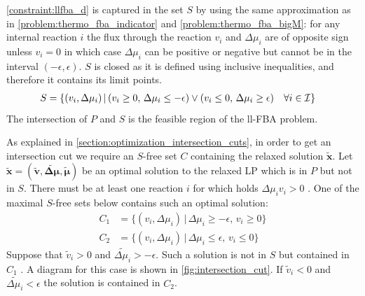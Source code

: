 \cref{constraint:llfba_d} is captured in the set $S$ by using the same approximation as in \cref{problem:thermo_fba_indicator} and \cref{problem:thermo_fba_bigM}:
for any internal reaction $i$ the flux through the reaction $v_i$ and $\Delta \mu_i$ are of opposite sign unless $v_i=0$ in which case $\Delta \mu_i$ can be positive or negative but cannot be in the interval $(- \epsilon, \epsilon)$. $S$ is closed as it is defined using inclusive inequalities, and therefore it contains its limit points. 
\begin{align*}
    \centering
    S &= \{(v_i, \Delta\mu_i) \, | \, (v_i \geq 0, \, \Delta \mu_i \leq - \epsilon) \lor (v_i \leq 0, \, \Delta \mu_i \geq \epsilon) \quad \forall i \in \mathcal{I}\}
\end{align*}
The intersection of $P$ and $S$ is the feasible region of the ll-FBA problem. 

As explained in \cref{section:optimization_intersection_cuts}, in order to get an intersection cut we require an $S$-free set $C$ containing the relaxed solution $\boldsymbol{\tilde x}$. Let $\boldsymbol{\tilde x} = (\boldsymbol{\tilde v}, \boldsymbol{\tilde{\Delta \mu}}, \boldsymbol{\tilde \mu})$ be an optimal solution to the relaxed LP which is in $P$ but not in $S$. There must be at least one reaction $i$ for which holds $\Delta \mu_i v_i > 0$ . One of the maximal $S$-free sets below contains such an optimal solution:
\begin{align*}
    C_1 &= \{(v_i, \Delta\mu_i) \, | \, \Delta \mu_i \geq - \epsilon, \, v_i \geq 0\} \\
    C_2 &= \{(v_i, \Delta\mu_i) \, | \, \Delta \mu_i \leq \epsilon, \, v_i \leq 0\} %
\end{align*}
Suppose that $\tilde v_i > 0$ and $\tilde{\Delta \mu_i} > -\epsilon$. Such a solution is not in $S$ but contained in $C_1$ . A diagram for this case is shown in \cref{fig:intersection_cut}. If $\tilde v_i < 0$ and $\tilde{\Delta \mu_i} < \epsilon$ the solution is contained in $C_2$.

